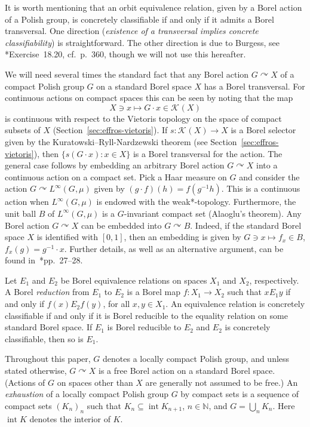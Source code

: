 \documentclass[12pt]{paper}
\numberwithin{equation}{section}
\theoremstyle{plain}
\theoremstyle{definition}
\newcommand{\N}{\mathbb{N}}
\newcommand{\vietoris}[2][]{\mathcal{K}_{#1}(#2)}
\DeclareMathOperator{\inter}{\mathrm{int}}
\newcommand{\acts}{\curvearrowright}
\begin{document}
It is worth mentioning that an orbit equivalence relation, given by a Borel action of a Polish
group, is concretely classifiable if and only if it admits a Borel transversal. One direction
(\emph{existence of a transversal implies concrete classifiability}) is straightforward. The other
direction is due to Burgess, see \cite{Kechris}*{Exercise~18.20, cf.\ p.~360}, though we will not
use this hereafter.

We will need several times the standard fact that any Borel action \(G\acts X\) of a compact Polish
group \(G\) on a standard Borel space \(X\) has a Borel transversal.  For continuous actions on
compact spaces this can be seen by noting that the map
\[
X \ni x \mapsto G \cdot x \in \vietoris{X}
\]
is continuous with respect to the Vietoris topology
on the space of compact subsets of \(X\) (Section~\ref{sec:effros-vietoris}).  If
\(s : \vietoris{X} \to X\) is a Borel selector given by the Kuratowski--Ryll-Nardzewski theorem (see
Section~\ref{sec:effros-vietoris}), then \(\{s(G \cdot x) : x \in X\}\) is a Borel transversal for
the action.  The general case follows by embedding an arbitrary Borel action \(G \acts X\) into a
continuous action on a compact set.  Pick a Haar measure on \(G\) and consider the action
\(G \acts L^{\infty}(G,\mu)\) given by \((g \cdot f)(h) = f(g^{-1}h)\).  This is a continuous action
when \(L^{\infty}(G,\mu)\) is endowed with the weak*-topology.  Furthermore, the unit ball \(B\) of
\(L^{\infty}(G,\mu)\) is a \(G\)-invariant compact set (Alaoglu's theorem).  Any Borel action
\(G \acts X\) can be embedded into \(G \acts B\).  Indeed, if the standard Borel space \(X\) is
identified with \([0,1]\), then an embedding is given by \(G \ni x \mapsto f_{x} \in B\),
\(f_{x}(g) = g^{-1}\cdot x\).  Further details, as well as an alternative argument, can be found
in~\cite{beckerDescriptiveSetTheory1996}*{pp.~27--28}.


Let \(E_{1}\) and \(E_{2}\) be Borel equivalence relations on spaces \(X_{1}\) and \(X_{2}\),
respectively. A Borel \emph{reduction} from \(E_{1}\) to \(E_{2}\) is a Borel map
\(f : X_{1} \to X_{2}\) such that \(x E_{1} y\) if and only if \(f(x) E_{2} f(y)\), for all
\(x,y \in X_{1}\).  An equivalence relation is concretely classifiable if and only if it is Borel
reducible to the equality relation on some standard Borel space.  If \(E_{1}\) is Borel reducible to
\(E_{2}\) and \(E_{2}\) is concretely classifiable, then so is \(E_{1}\).

Throughout this paper, \(G\) denotes a locally compact Polish group, and unless stated otherwise,
\(G \acts X\) is a free Borel action on a standard Borel space.  (Actions of \(G\) on spaces other
than \(X\) are generally not assumed to be free.)  An \emph{exhaustion} of a locally compact Polish
group \(G\) by compact sets is a sequence of compact sets \((K_{n})_{n}\) such that
\(K_{n} \subseteq \inter K_{n+1}\), \(n \in \N\), and \(G = \bigcup_{n} K_{n}\).  Here \(\inter K\)
denotes the interior of \(K\).
\end{document}
